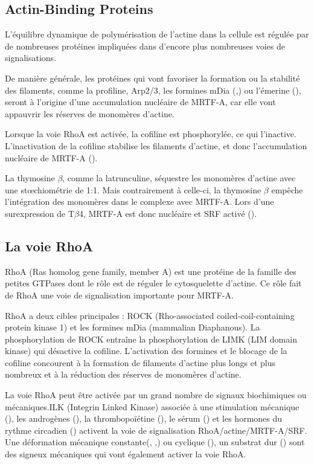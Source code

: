 \documentclass{report}
\begin{document}
\subsection{Actin-Binding Proteins}

L'équilibre dynamique de polymérisation de l'actine dans la cellule est régulée par de nombreuses protéines impliquées dans d'encore plus nombreuses voies de signalisations. 

De manière générale, les protéines qui vont favoriser la formation ou la stabilité des filaments, comme la profiline, Arp2/3, les formines mDia (\cite{chan_force-induced_2010},\cite{baarlink_nuclear_2013}) ou l'émerine (\cite{ho_lamin_2013}), seront à l'origine d'une accumulation nucléaire de MRTF-A, car elle vont appauvrir les réserves de monomères d'actine. 

Lorsque la voie RhoA est activée, la cofiline est phosphorylée, ce qui l'inactive. L'inactivation de la cofiline stabilise les filaments d'actine, et donc l'accumulation nucléaire de MRTF-A (\cite{zhao_force_2007}). 

La thymosine $\beta$, comme la latrunculine, séquestre les monomères d'actine avec une st\oe chiométrie de 1:1. Mais contrairement à celle-ci, la thymosine $\beta$ empêche l'intégration des monomères dans le complexe avec MRTF-A. Lors d'une surexpression de T$\beta$4, MRTF-A est donc nucléaire et SRF activé (\cite{morita_g-actin_2013}).




\subsection{La voie RhoA}

RhoA (Ras homolog gene family, member A) est une protéine de la famille des petites GTPases dont le rôle est de réguler le cytosquelette d'actine. Ce rôle fait de RhoA une voie de signalisation importante pour MRTF-A. 

RhoA a deux cibles principales : ROCK (Rho-associated coiled-coil-containing protein kinase 1) et les formines mDia (mammalian Diaphanous). La phosphorylation de ROCK entraîne la phosphorylation de LIMK (LIM domain kinase) qui désactive la cofiline. L'activation des formines et le blocage de la cofiline concourent à la formation de filaments d'actine plus longs et plus nombreux et à la réduction des réserves de monomères d'actine. 

La voie RhoA peut être activée par un grand nombre de signaux biochimiques ou mécaniques.ILK (Integrin Linked Kinase) associée à une stimulation mécanique (\cite{maier_tenascin-c_2008}), les androgènes (\cite{schmidt_rhoa_2012}), la thrombopoïétine (\cite{smith_induction_2013}), le sérum (\cite{sotiropoulos_signal-regulated_1999}) et les hormones du rythme circadien (\cite{gerber_blood-borne_2013}) activent la voie de signalisation RhoA/actine/MRTF-A/SRF. 
Une déformation mécanique constante(\cite{albinsson_stretch_2004}, \cite{zhao_force_2007},\cite{chan_force-induced_2010}) ou cyclique (\cite{kuwahara_myocardin-related_2010}), un substrat dur (\cite{huang_matrix_2012}) sont des signeux mécaniques qui vont également activer la voie RhoA. 
\end{document}

